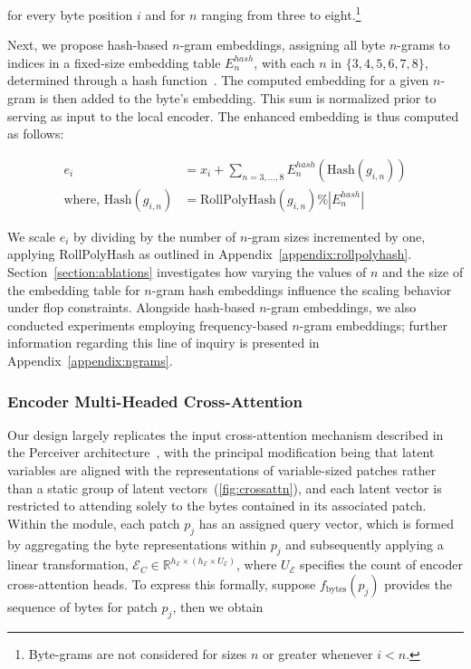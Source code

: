 for every byte position $i$ and for $n$ ranging from three to eight.\footnote{
Byte-grams are not considered for sizes $n$ or greater whenever $i<n$. }

Next, we propose hash-based $n$-gram embeddings, assigning all byte $n$-grams to indices in a fixed-size embedding table $E_{n}^{hash}$, with each $n$ in $\{3,4,5,6,7,8\}$, determined through a hash function~\citep{bai2010learning}. The computed embedding for a given $n$-gram is then added to the byte’s embedding. This sum is normalized prior to serving as input to the local encoder. The enhanced embedding is thus computed as follows:

\begin{align}
e_i &= x_i + \sum_{n = 3,...,8}E_{n}^{hash}(\text{Hash}(g_{i,n})) \\
\text{where, Hash}(g_{i,n}) &= \text{RollPolyHash}(g_{i,n}) \% |E_{n}^{hash}|
\end{align}

We scale $e_i$ by dividing by the number of $n$-gram sizes incremented by one, applying RollPolyHash as outlined in Appendix~\ref{appendix:rollpolyhash}. Section~\ref{section:ablations} investigates how varying the values of $n$ and the size of the embedding table for $n$-gram hash embeddings influence the scaling behavior under flop constraints. Alongside hash-based $n$-gram embeddings, we also conducted experiments employing frequency-based $n$-gram embeddings; further information regarding this line of inquiry is presented in Appendix~\ref{appendix:ngrams}.

\subsubsection{Encoder Multi-Headed Cross-Attention}
\label{sec:enc-cross-attn}
Our design largely replicates the input cross-attention mechanism described in the Perceiver architecture~\citep{jaegle2021perceiver}, with the principal modification being that latent variables are aligned with the representations of variable-sized patches rather than a static group of latent vectors~(\autoref{fig:crossattn}), and each latent vector is restricted to attending solely to the bytes contained in its associated patch. Within the module, each patch $p_j$ has an assigned query vector, which is formed by aggregating the byte representations within $p_j$ and subsequently applying a linear transformation, $\mathcal{E}_{C} \in \mathbb{R}^{h_{\mathcal{E}} \times (h_{\mathcal{E}} \times U_{\mathcal{E}})}$, where $U_{\mathcal{E}}$ specifies the count of encoder cross-attention heads. To express this formally, suppose $f_{\text{bytes}}(p_j)$ provides the sequence of bytes for patch $p_j$, then we obtain

